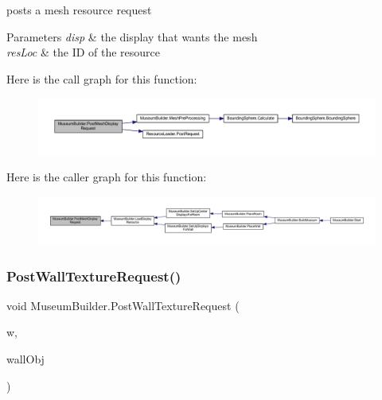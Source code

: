 posts a mesh resource request 


\begin{DoxyParams}{Parameters}
{\em disp} & the display that wants the mesh\\
\hline
{\em res\+Loc} & the ID of the resource\\
\hline
\end{DoxyParams}
Here is the call graph for this function\+:
\nopagebreak
\begin{figure}[H]
\begin{center}
\leavevmode
\includegraphics[width=350pt]{class_museum_builder_a4e5fce7036671ef7bf735b341e56bbf2_cgraph}
\end{center}
\end{figure}
Here is the caller graph for this function\+:
\nopagebreak
\begin{figure}[H]
\begin{center}
\leavevmode
\includegraphics[width=350pt]{class_museum_builder_a4e5fce7036671ef7bf735b341e56bbf2_icgraph}
\end{center}
\end{figure}
\mbox{\label{class_museum_builder_aa4b2759977e29fa40cea22b6f31242ac}} 
\subsubsection{\texorpdfstring{Post\+Wall\+Texture\+Request()}{PostWallTextureRequest()}}
{\footnotesize\ttfamily void Museum\+Builder.\+Post\+Wall\+Texture\+Request (\begin{DoxyParamCaption}\item[{\mbox{\hyperlink{class_wall}{Wall}}}]{w,  }\item[{Game\+Object}]{wall\+Obj }\end{DoxyParamCaption})\hspace{0.3cm}{\ttfamily [private]}}



